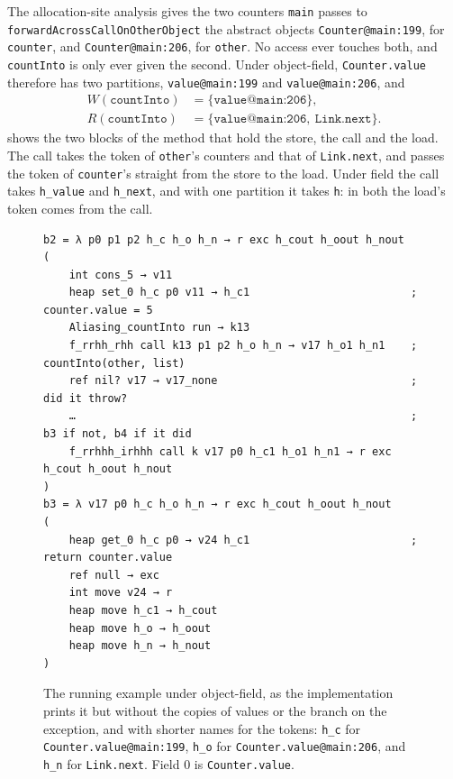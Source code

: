 \begin{example}\label{ex:ee-running-tokens}
The allocation-site analysis gives the two counters \texttt{main} passes to
\texttt{forwardAcrossCallOnOtherObject} the abstract objects
\texttt{Counter@main:199}, for \texttt{counter}, and \texttt{Counter@main:206},
for \texttt{other}. No access ever touches both, and \texttt{countInto} is only
ever given the second. Under object-field, \texttt{Counter.value} therefore has
two partitions, \texttt{value@main:199} and \texttt{value@main:206}, and
\begin{align*}
W(\texttt{countInto}) &= \{\texttt{value@main:206}\},\\
R(\texttt{countInto}) &= \{\texttt{value@main:206},\ \texttt{Link.next}\}.
\end{align*}
 shows the two blocks of the method that hold the
store, the call and the load. The call takes the token of \texttt{other}'s
counters and that of \texttt{Link.next}, and passes the token of
\texttt{counter}'s straight from the store to the load. Under field the call
takes \texttt{h\_value} and \texttt{h\_next}, and with one partition it takes
\texttt{h}: in both the load's token comes from the call.
\end{example}

\begin{figure}[tbp]
\begin{lstlisting}[language=ct]
b2 = λ p0 p1 p2 h_c h_o h_n → r exc h_cout h_oout h_nout
(
    int cons_5 → v11
    heap set_0 h_c p0 v11 → h_c1                         ; counter.value = 5
    Aliasing_countInto run → k13
    f_rrhh_rhh call k13 p1 p2 h_o h_n → v17 h_o1 h_n1    ; countInto(other, list)
    ref nil? v17 → v17_none                              ; did it throw?
    …                                                    ; b3 if not, b4 if it did
    f_rrhhh_irhhh call k v17 p0 h_c1 h_o1 h_n1 → r exc h_cout h_oout h_nout
)
b3 = λ v17 p0 h_c h_o h_n → r exc h_cout h_oout h_nout
(
    heap get_0 h_c p0 → v24 h_c1                         ; return counter.value
    ref null → exc
    int move v24 → r
    heap move h_c1 → h_cout
    heap move h_o → h_oout
    heap move h_n → h_nout
)
\end{lstlisting}
\caption{The running example under object-field, as the implementation prints
it but without the copies of values or the branch on the exception, and with
shorter names for the tokens:
\texttt{h\_c} for \texttt{Counter.value@main:199}, \texttt{h\_o} for
\texttt{Counter.value@main:206}, and \texttt{h\_n} for \texttt{Link.next}.
Field 0 is \texttt{Counter.value}.}
\label{fig:ee-running-tokens}
\end{figure}

